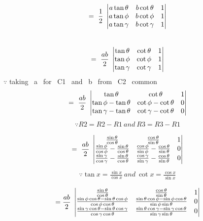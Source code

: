 \documentclass[journal,12pt,twocolumn]{IEEEtran}
\begin{document}
\begin{multline}
=~\frac{1}{2}~\begin{vmatrix}
 a\tan\theta & b\cot\theta & 1  \\ 
 a\tan\phi & b\cot\phi & 1  \\
 a\tan\gamma & b\cot\gamma & 1 
\end{vmatrix}\end{multline}\\
\begin{multline}
=~\frac{ab}{2}~\begin{vmatrix}
 \tan\theta & \cot\theta & 1  \\ 
 \tan\phi &   \cot\phi & 1  \\
 \tan\gamma & \cot\gamma & 1 
\end{vmatrix}
\end{multline}
$\because$ taking ~a~ for ~C1 ~and~ b ~from~ C2~ common 
\begin{multline}
=~\frac{ab}{2}~\begin{vmatrix}
 \tan\theta & \cot\theta & 1  \\ 
 \tan\phi-\tan\theta & \cot\phi-\cot\theta & 0  \\
 \tan\gamma-\tan\theta & \cot\gamma-\cot\theta & 0 
\end{vmatrix}\end{multline}
\begin{align*}
\because R2=R2-R1 ~and~ R3=R3-R1
\end{align*}

\begin{multline}
=~\frac{ab}{2}~\begin{vmatrix}
 \frac{\sin\theta}{\cos\theta} & \frac{\cos\theta}{\sin\theta} & 1  \\ 
 \frac{\sin\phi}{\cos\phi}-\frac{\sin\theta}{\cos\theta} & \frac{\cos\phi}{\sin\phi}-\frac{\cos\theta}{\sin\theta} & 0  \\
 \frac{\sin\gamma}{\cos\gamma}-\frac{\sin\theta}{\cos\theta} & \frac{\cos\gamma}{\sin\gamma}-\frac{\cos\theta}{\sin\theta} & 0 
\end{vmatrix}\end{multline}
\begin{align*}
\because \tan x = \frac{\sin x}{\cos x}~and~\cot x = \frac{\cos x}{\sin x} \end{align*}

\begin{multline}
=\frac{ab}{2}~\begin{vmatrix}
 \frac{\sin\theta}{\cos\theta} & \frac{\cos\theta}{\sin\theta} & 1  \\ 
 \frac{\sin\phi\cos\theta - \sin\theta\cos\phi}{\cos\phi\cos\theta} & \frac{\sin\theta\cos\phi - \sin\phi\cos\theta}{\sin\phi\sin\theta} & 0  \\
  \frac{\sin\gamma\cos\theta - \sin\theta\cos\gamma}{\cos\gamma\cos\theta} & \frac{\sin\theta\cos\gamma - \sin\gamma\cos\theta}{\sin\gamma\sin\theta} & 0
\end{vmatrix}   
\end{multline}
\end{document}

